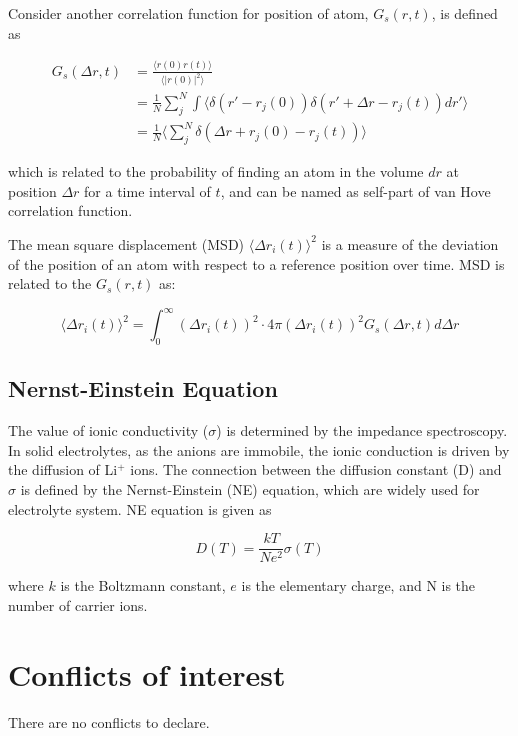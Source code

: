 \documentclass[twoside,twocolumn,9pt]{article}
\begin{document}
Consider another correlation function for position of atom, $G_s(r,t)$, is defined as

\begin{align*}
G_s(\Delta r,t)&=\frac{\langle r(0)r(t)\rangle}{\langle | r(0)|^2 \rangle} \\
        &=\frac{1}{N}\sum_{j}^{N}\int \langle \delta(r'-r_j(0))\delta(r'+\Delta r -r_j(t))dr' \rangle \\
        &=\frac{1}{N}\langle \sum_{j}^{N}\delta(\Delta r +r_j(0)-r_j(t))\rangle
\end{align*}

which is related to the probability of finding an atom in the volume $dr$ at position $\Delta r$ for a time interval of $t$,
and can be named as self-part of van Hove correlation function.

The mean square displacement (MSD) $\langle \Delta r_i(t)\rangle ^2$  is a measure of the deviation of the position of an atom with
respect to a reference position over time. MSD is related to the $G_s(r,t)$ as:

\begin{equation}
  \langle \Delta r_i(t)\rangle ^2=\int_{0}^{\infty} (\Delta r_i(t))^2\cdot 4\pi(\Delta r_i(t))^2G_s(\Delta r,t)d\Delta r
\end{equation}

\subsection{ Nernst-Einstein  Equation}

The value of ionic conductivity ($\sigma$) is determined by the impedance spectroscopy.
In solid electrolytes, as the anions are immobile, the ionic conduction is driven by the diffusion of Li$^+$ ions.
The connection between the diffusion constant (D) and $\sigma$ is defined by the Nernst-Einstein (NE) equation,
which are widely used for electrolyte system. NE equation is given as

\begin{equation}
D(T)=\frac{kT}{Ne^2}\sigma(T)
\end{equation}

where $k$ is the Boltzmann constant, $e$ is the elementary charge, and N is the number of carrier ions.

\section*{Conflicts of interest}
There are no conflicts to declare.
\end{document}

